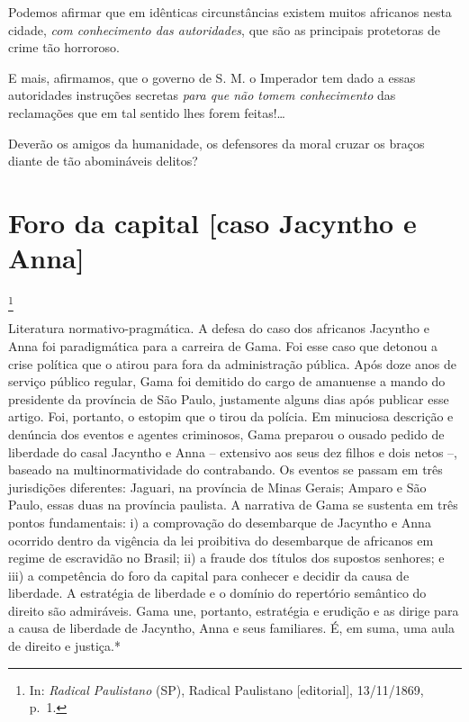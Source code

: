 Podemos afirmar que em idênticas circunstâncias existem muitos africanos
nesta cidade, \emph{com conhecimento das autoridades}, que são as
principais protetoras de crime tão horroroso.

E mais, afirmamos, que o governo de S. M. o Imperador tem dado a essas
autoridades instruções secretas \emph{para que não tomem conhecimento}
das reclamações que em tal sentido lhes forem feitas!\ldots

Deverão os amigos da humanidade, os defensores da moral cruzar os braços
diante de tão abomináveis delitos?

\chapter{Foro da capital {[}caso Jacyntho e Anna{]}}\footnote{In:
  \emph{Radical Paulistano} (SP), Radical Paulistano {[}editorial{]},
  13/11/1869, p.~1.}

\begin{didascalia}
Literatura normativo-pragmática. A defesa do caso dos africanos Jacyntho
e Anna foi paradigmática para a carreira de Gama. Foi esse caso que
detonou a crise política que o atirou para fora da administração
pública. Após doze anos de serviço público regular, Gama foi demitido do
cargo de amanuense a mando do presidente da província de São Paulo,
justamente alguns dias após publicar esse artigo. Foi, portanto, o
estopim que o tirou da polícia. Em minuciosa descrição e denúncia dos
eventos e agentes criminosos, Gama preparou o ousado pedido de liberdade
do casal Jacyntho e Anna -- extensivo aos seus dez filhos e dois netos
--, baseado na multinormatividade do contrabando. Os eventos se passam
em três jurisdições diferentes: Jaguari, na província de Minas Gerais;
Amparo e São Paulo, essas duas na província paulista. A narrativa de
Gama se sustenta em três pontos fundamentais: i) a comprovação do
desembarque de Jacyntho e Anna ocorrido dentro da vigência da lei
proibitiva do desembarque de africanos em regime de escravidão no
Brasil; ii) a fraude dos títulos dos supostos senhores; e iii) a
competência do foro da capital para conhecer e decidir da causa de
liberdade. A estratégia de liberdade e o domínio do repertório semântico
do direito são admiráveis. Gama une, portanto, estratégia e erudição e
as dirige para a causa de liberdade de Jacyntho, Anna e seus familiares.
É, em suma, uma aula de direito e justiça.*
\end{didascalia}

\asterisc{}

